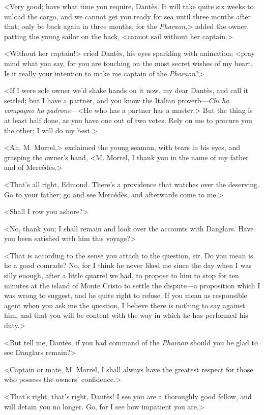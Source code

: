  <Very good; have what time you require, Dantès. It will take quite six weeks to unload the cargo, and we cannot get you ready for sea until three months after that; only be back again in three months, for the \textit{Pharaon},> added the owner, patting the young sailor on the back, <cannot sail without her captain.> 

 <Without her captain!> cried Dantès, his eyes sparkling with animation; <pray mind what you say, for you are touching on the most secret wishes of my heart. Is it really your intention to make me captain of the \textit{Pharaon}?> 

 <If I were sole owner we'd shake hands on it now, my dear Dantès, and call it settled; but I have a partner, and you know the Italian proverb—\textit{Chi ha compagno ha padrone}—<He who has a partner has a master.> But the thing is at least half done, as you have one out of two votes. Rely on me to procure you the other; I will do my best.> 

 <Ah, M. Morrel,> exclaimed the young seaman, with tears in his eyes, and grasping the owner's hand, <M. Morrel, I thank you in the name of my father and of Mercédès.> 

 <That's all right, Edmond. There's a providence that watches over the deserving. Go to your father; go and see Mercédès, and afterwards come to me.> 

 <Shall I row you ashore?> 

 <No, thank you; I shall remain and look over the accounts with Danglars. Have you been satisfied with him this voyage?> 

 <That is according to the sense you attach to the question, sir. Do you mean is he a good comrade? No, for I think he never liked me since the day when I was silly enough, after a little quarrel we had, to propose to him to stop for ten minutes at the island of Monte Cristo to settle the dispute—a proposition which I was wrong to suggest, and he quite right to refuse. If you mean as responsible agent when you ask me the question, I believe there is nothing to say against him, and that you will be content with the way in which he has performed his duty.> 

 <But tell me, Dantès, if you had command of the \textit{Pharaon} should you be glad to see Danglars remain?> 

 <Captain or mate, M. Morrel, I shall always have the greatest respect for those who possess the owners' confidence.> 

 <That's right, that's right, Dantès! I see you are a thoroughly good fellow, and will detain you no longer. Go, for I see how impatient you are.> 

